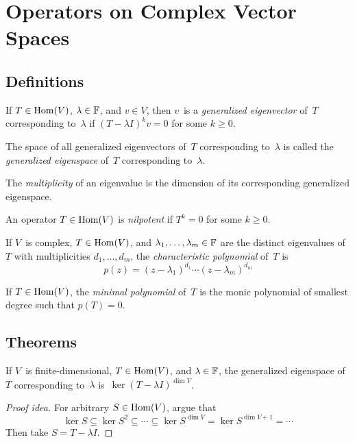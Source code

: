%
%
%
\section{Operators on Complex Vector Spaces}
\subsection*{Definitions}
\begin{defn}
If \(T\in\operatorname{Hom}(V)\), \(\lambda\in\mathbb{F}\), and \(v\in V\), then \(v\)~is a \emph{generalized eigenvector} of~\(T\) corresponding to~\(\lambda\) if \((T-\lambda I)^kv=0\) for some \(k\ge0\).

The space of all generalized eigenvectors of~\(T\) corresponding to~\(\lambda\) is called the \emph{generalized eigenspace} of~\(T\) corresponding to~\(\lambda\).
\end{defn}

\begin{defn}
The \emph{multiplicity} of an eigenvalue is the dimension of its corresponding generalized eigenspace.
\end{defn}

\begin{defn}
An operator \(T\in\operatorname{Hom}(V)\) is \emph{nilpotent} if \(T^k=0\) for some \(k\ge0\).
\end{defn}

\begin{defn}
If \(V\)~is complex, \(T\in\operatorname{Hom}(V)\), and \(\lambda_1,\ldots,\lambda_m\in\mathbb{F}\) are the distinct eigenvalues of~\(T\) with multiplicities \(d_1,\ldots,d_m\), the \emph{characteristic polynomial} of~\(T\) is
\[p(z)=(z-\lambda_1)^{d_1}\cdots(z-\lambda_m)^{d_m}\]
\end{defn}

\begin{defn}
If \(T\in\operatorname{Hom}(V)\), the \emph{minimal polynomial} of~\(T\) is the monic polynomial of smallest degree such that \(p(T)=0\).
\end{defn}

\subsection*{Theorems}
\begin{thm}
If \(V\)~is finite-dimensional, \(T\in\operatorname{Hom}(V)\), and \(\lambda\in\mathbb{F}\), the generalized eigenspace of~\(T\) corresponding to~\(\lambda\) is~\(\ker(T-\lambda I)^{\dim V}\).
\end{thm}
\begin{proof}[Proof idea]
For arbitrary \(S\in\operatorname{Hom}(V)\), argue that
\[\ker S\subseteq\ker S^2\subseteq\cdots\subseteq\ker S^{\dim V}=\ker S^{\dim V+1}=\cdots\]
Then take \(S=T-\lambda I\).
\end{proof}

